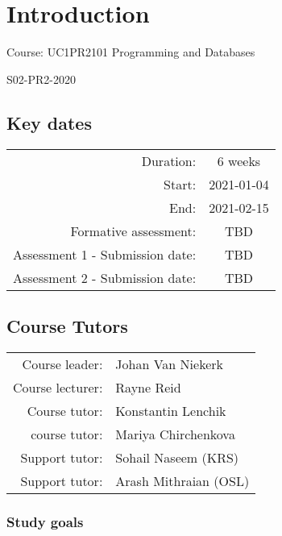 \section{Introduction}

{\huge{Course: UC1PR2101 Programming and Databases}}

S02-PR2-2020

\subsection{Key dates}

\begin{tabular}{r @{} c}
    Duration: & 6 weeks\\
    Start: & 2021-01-04\\
    End: & 2021-02-15\\
    Formative assessment: & TBD\\
    Assessment 1 - Submission date: & TBD\\
    Assessment 2 - Submission date: & TBD\\
\end{tabular}

\subsection{Course Tutors}

\begin{tabular}{r @{} l}
    Course leader: & Johan Van Niekerk\\
    Course lecturer: & Rayne Reid\\
    Course tutor: & Konstantin Lenchik\\
    course tutor: & Mariya Chirchenkova\\
    Support tutor: & Sohail Naseem (KRS)\\
    Support tutor: & Arash Mithraian (OSL)\\
\end{tabular}

\subsubsection{Study goals}

